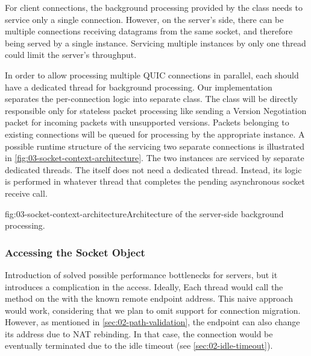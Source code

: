 For client connections, the background processing provided by the \QuicSocketContext{} class needs
to service only a single connection. However, on the server's side, there can be multiple
connections receiving datagrams from the same socket, and therefore being served by a single
\QuicSocketContext{} instance. Servicing multiple \QuicConnection{} instances by only one thread
could limit the server's throughput.

In order to allow processing multiple QUIC connections in parallel, each \QuicConnection{} should
have a dedicated thread for background processing. Our implementation separates the per-connection
logic into separate \QuicConnectionContext{} class. The \QuicSocketContext{} class will be directly
responsible only for stateless packet processing like sending a Version Negotiation packet for
incoming packets with unsupported versions. Packets belonging to existing connections will be queued
for processing by the appropriate \QuicConnectionContext{} instance. A possible runtime structure of
the \QuicSocketContext{} servicing two separate connections is illustrated in
\autoref{fig:03-socket-context-architecture}. The two \QuicConnectionContext{} instances are
serviced by separate dedicated threads. The \QuicSocketContext{} itself does not need a dedicated
thread. Instead, its logic is performed in whatever thread that completes the pending asynchronous
socket receive call.

\begin{myFigure}{fig:03-socket-context-architecture}{Architecture of the server-side background
processing.}

\resizebox{0.95\linewidth}{!}{}

\end{myFigure}

\subsubsection{Accessing the Socket Object}

Introduction of \QuicConnectionContext{} solved possible performance bottlenecks for servers, but it
introduces a complication in the \Socket{} access. Ideally, Each thread would call the
 method on the \Socket{} with the known remote endpoint address. This naive
approach would work, considering that we plan to omit support for connection migration. However, as
mentioned in \autoref{sec:02-path-validation}, the endpoint can also change its address due to NAT
rebinding. In that case, the connection would be eventually terminated due to the idle timeout (see
\autoref{sec:02-idle-timeout}).

